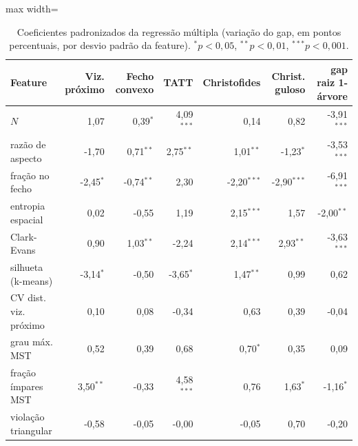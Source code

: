 \begin{table}[htb]
\centering
\caption{Coeficientes padronizados da regressão múltipla (variação do gap, em pontos percentuais, por desvio padrão da feature). $^{*}p<0{,}05$, $^{**}p<0{,}01$, $^{***}p<0{,}001$.}
\label{tab:coeficientes}
\small
\begin{adjustbox}{max width=\linewidth}
\begin{tabular}{lrrrrrr}
\toprule
Feature & Viz. próximo & Fecho convexo & TATT & Christofides & Christ. guloso & gap raiz 1-árvore \\
\midrule
$N$ & 1{,}07 & 0{,}39$^{*}$ & 4{,}09$^{***}$ & 0{,}14 & 0{,}82 & -3{,}91$^{***}$ \\
razão de aspecto & -1{,}70 & 0{,}71$^{**}$ & 2{,}75$^{**}$ & 1{,}01$^{**}$ & -1{,}23$^{*}$ & -3{,}53$^{***}$ \\
fração no fecho & -2{,}45$^{*}$ & -0{,}74$^{**}$ & 2{,}30 & -2{,}20$^{***}$ & -2{,}90$^{***}$ & -6{,}91$^{***}$ \\
entropia espacial & 0{,}02 & -0{,}55 & 1{,}19 & 2{,}15$^{***}$ & 1{,}57 & -2{,}00$^{**}$ \\
Clark-Evans & 0{,}90 & 1{,}03$^{**}$ & -2{,}24 & 2{,}14$^{***}$ & 2{,}93$^{**}$ & -3{,}63$^{***}$ \\
silhueta (k-means) & -3{,}14$^{*}$ & -0{,}50 & -3{,}65$^{*}$ & 1{,}47$^{**}$ & 0{,}99 & 0{,}62 \\
CV dist. viz. próximo & 0{,}10 & 0{,}08 & -0{,}34 & 0{,}63 & 0{,}39 & -0{,}04 \\
grau máx. MST & 0{,}52 & 0{,}39 & 0{,}68 & 0{,}70$^{*}$ & 0{,}35 & 0{,}09 \\
fração ímpares MST & 3{,}50$^{**}$ & -0{,}33 & 4{,}58$^{***}$ & 0{,}76 & 1{,}63$^{*}$ & -1{,}16$^{*}$ \\
violação triangular & -0{,}58 & -0{,}05 & -0{,}00 & -0{,}05 & 0{,}70 & -0{,}20 \\
\bottomrule
\end{tabular}
\end{adjustbox}
\end{table}
